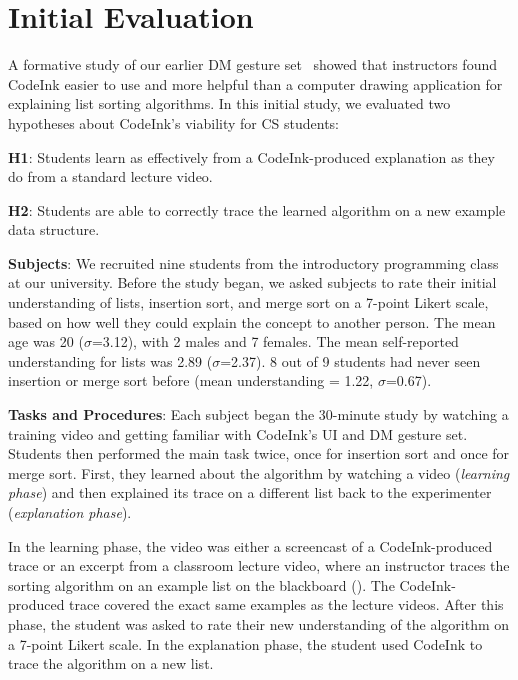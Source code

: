 \section{Initial Evaluation}

A formative study of our earlier DM gesture set~\cite{Scott2014} showed
that instructors found CodeInk easier to use and more helpful than a
computer drawing application for explaining list sorting algorithms. In
this initial study, we evaluated two hypotheses about CodeInk's
viability for CS students:

\noindent \textbf{H1}: Students learn as effectively from a
CodeInk-produced explanation as they do from a standard lecture video.

\noindent \textbf{H2}: Students are able to correctly trace the learned
algorithm on a new example data structure.

\noindent \textbf{Subjects}: We recruited nine students from the
introductory programming class at our university. Before the study
began, we asked subjects to rate their initial understanding of lists,
insertion sort, and merge sort on a 7-point Likert scale, based on how
well they could explain the concept to another person. The mean age was
20 ($\sigma$=3.12), with 2 males and 7 females. The mean self-reported
understanding for lists was 2.89 ($\sigma$=2.37). 8 out of 9 students
had never seen insertion or merge sort before (mean understanding =
1.22, $\sigma$=0.67).

\noindent \textbf{Tasks and Procedures}: Each subject began the
30-minute study by watching a training video and getting familiar with
CodeInk's UI and DM gesture set. Students then performed the main task
twice, once for insertion sort and once for merge sort. First, they
learned about the algorithm by watching a video ({\em learning phase})
and then explained its trace on a different list back to the
experimenter ({\em explanation phase}).

In the learning phase, the video was either a screencast of a
CodeInk-produced trace or an excerpt from a classroom lecture
video, where an instructor traces the sorting algorithm on an example
list on the blackboard (). The CodeInk-produced
trace covered the exact same examples as the lecture videos. After this
phase, the student was asked to rate their new understanding of the
algorithm on a 7-point Likert scale. In the explanation phase, the
student used CodeInk to trace the algorithm on a new list.

